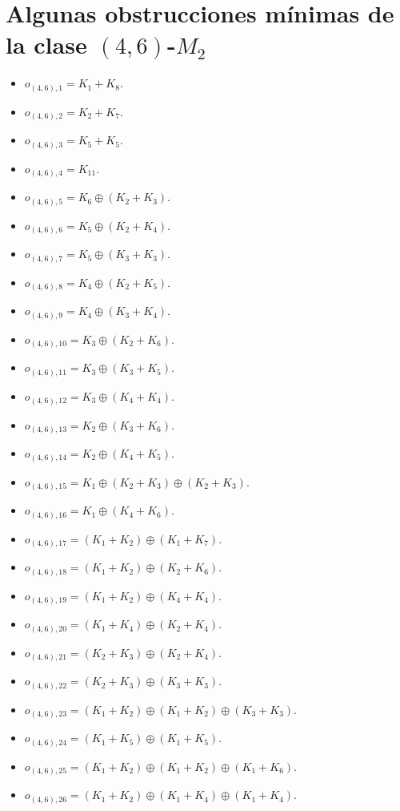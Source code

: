 \section{Algunas obstrucciones mínimas de la clase $(4,6)$-$M_2$}
\begin{itemize}
    \item $o_{(4,6),1} = K_1+K_8$.
    \item $o_{(4,6),2} = K_2+K_7$.
    \item $o_{(4,6),3} = K_5+K_5$.
    \item $o_{(4,6),4} = K_{11}$.
    \item $o_{(4,6),5} = K_6\oplus(K_2+K_3)$.
    \item $o_{(4,6),6} = K_5\oplus(K_2+K_4)$.
    \item $o_{(4,6),7} = K_5\oplus(K_3+K_3)$.
    \item $o_{(4,6),8} = K_4\oplus(K_2+K_5)$.
    \item $o_{(4,6),9} = K_4\oplus(K_3+K_4)$.
    \item $o_{(4,6),10} = K_3\oplus(K_2+K_6)$.
    \item $o_{(4,6),11} = K_3\oplus(K_3+K_5)$.
    \item $o_{(4,6),12} = K_3\oplus(K_4+K_4)$.
    \item $o_{(4,6),13} = K_2\oplus(K_3+K_6)$.
    \item $o_{(4,6),14} = K_2\oplus(K_4+K_5)$.
    \item $o_{(4,6),15} = K_1\oplus(K_2+K_3)\oplus(K_2+K_3)$.
    \item $o_{(4,6),16} = K_1\oplus(K_4+K_6)$.
    \item $o_{(4,6),17} = (K_1+K_2)\oplus(K_1+K_7)$.
    \item $o_{(4,6),18} = (K_1+K_2)\oplus(K_2+K_6)$.
    \item $o_{(4,6),19} = (K_1+K_2)\oplus(K_4+K_4)$.
    \item $o_{(4,6),20} = (K_1+K_4)\oplus(K_2+K_4)$.
    \item $o_{(4,6),21} = (K_2+K_3)\oplus(K_2+K_4)$.
    \item $o_{(4,6),22} = (K_2+K_3)\oplus(K_3+K_3)$.
    \item $o_{(4,6),23} = (K_1+K_2)\oplus(K_1+K_2)\oplus(K_3+K_3)$.
    \item $o_{(4,6),24} = (K_1+K_5)\oplus(K_1+K_5)$.
    \item $o_{(4,6),25} = (K_1+K_2)\oplus(K_1+K_2)\oplus(K_1+K_6)$.
    \item $o_{(4,6),26} = (K_1+K_2)\oplus(K_1+K_4)\oplus(K_1+K_4)$.
\end{itemize}